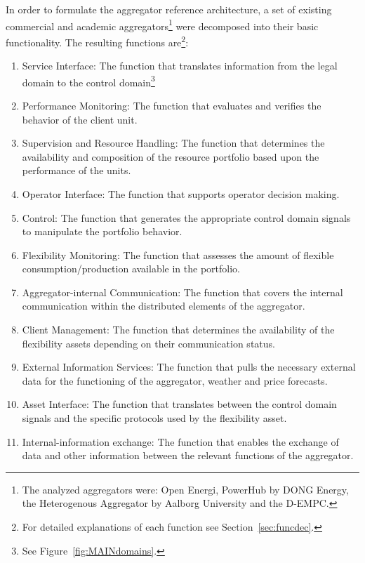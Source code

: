 In order to formulate the aggregator reference architecture, a set of existing commercial and academic aggregators\footnote[][-2em]{The analyzed aggregators were: Open Energi\cite{openenergi}, PowerHub by DONG Energy\cite{powerhub}, the Heterogenous Aggregator by Aalborg University\cite{rahnama2014evaluation} and the D-EMPC\cite{costanzo2013coordination}.}  were decomposed into their basic functionality. The resulting functions are\footnote{For detailed explanations of each function see Section~\ref{sec:funcdec}.}:

\begin{enumerate}[label=\Alph*]
	\item Service Interface: The function that translates information from the legal domain to the control domain\footnote{See Figure~\ref{fig:MAINdomains}.}
	\item Performance Monitoring: The function that evaluates and verifies the behavior of the client unit.
	\item Supervision and Resource Handling: The function that determines the availability and composition of the resource portfolio based upon the performance of the units.
	\item Operator Interface: The function that supports operator decision making.
	\item Control: The function that generates the appropriate control domain signals to manipulate the portfolio behavior.
	\item Flexibility Monitoring: The function that assesses the amount of flexible consumption/production available in the portfolio.
	\item Aggregator-internal Communication: The function that covers the internal communication within the distributed elements of the aggregator.
	\item Client Management: The function that determines the availability of the flexibility assets depending on their communication status.
	\item External Information Services: The function that pulls the necessary external data for the functioning of the aggregator, \eg weather and price forecasts.
	\item Asset Interface: The function that translates between the control domain signals and the specific protocols used by the flexibility asset.
	\item Internal-information exchange: The function that enables the exchange of data and other information between the relevant functions of the aggregator.
\end{enumerate}

